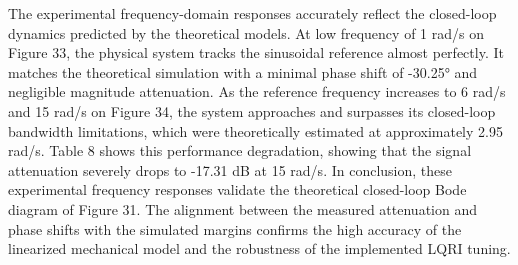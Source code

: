 The experimental frequency-domain responses accurately reflect the closed-loop dynamics predicted by the theoretical models. At low frequency of 1 rad/s on Figure 33, the physical system tracks the sinusoidal reference almost perfectly. It matches the theoretical simulation with a minimal phase shift of -30.25° and negligible magnitude attenuation.
As the reference frequency increases to 6 rad/s and 15 rad/s on Figure 34, the system approaches and surpasses its closed-loop bandwidth limitations, which were theoretically estimated at approximately 2.95 rad/s. Table 8 shows this performance degradation, showing that the signal attenuation severely drops to -17.31 dB at 15 rad/s.
In conclusion, these experimental frequency responses validate the theoretical closed-loop Bode diagram of Figure 31. The alignment between the measured attenuation and phase shifts with the simulated margins confirms the high accuracy of the linearized mechanical model and the robustness of the implemented LQRI tuning.
